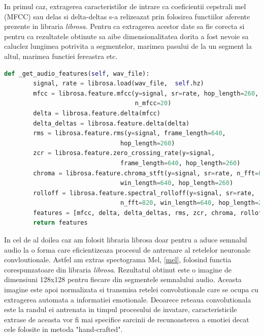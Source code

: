 \documentclass[a4paper,12pt]{book}
\begin{document}
				In primul caz, extragerea caracteristilor de intrare ca coeficientii cepstrali mel (MFCC) sau delas si delta-deltas s-a relizeazat prin folosirea functiilor aferente prezente in libraria \textit{librosa}. Pentru ca extragerea acestor date sa fie corecta si pentru ca rezultatele obtinute sa aibe dimensionalitatea dorita a fost nevoie sa caluclez lungimea potrivita a segmentelor, marimea pasului de la un segment la altul, marimea functiei fereastra etc. \par
				
				\begin{lstlisting}[language=Python, caption={Extragerea caracteristicilor hand-crafted, 3.3, folosind libraria librosa.}, xleftmargin=0cm]
 def _get_audio_features(self, wav_file):
		signal, rate = librosa.load(wav_file,  self.hz)
		mfcc = librosa.feature.mfcc(y=signal, sr=rate, hop_length=260, 
									n_mfcc=20)
		delta = librosa.feature.delta(mfcc)
		delta_deltas = librosa.feature.delta(delta)
		rms = librosa.feature.rms(y=signal, frame_length=640, 
								hop_length=260)
		zcr = librosa.feature.zero_crossing_rate(y=signal, 
								frame_length=640, hop_length=260)
		chroma = librosa.feature.chroma_stft(y=signal, sr=rate, n_fft=820, 
								win_length=640,	hop_length=260)
		rolloff = librosa.feature.spectral_rolloff(y=signal, sr=rate, 
								n_fft=820, win_length=640, hop_length=260)
		features = [mfcc, delta, delta_deltas, rms, zcr, chroma, rolloff]
		return features	\end{lstlisting}
				
				In cel de al doilea caz am folosit libraria librosa doar pentru a aduce semnalul audio la o forma care eficientizeaza procesul de antrenare al retelelor neuronale convloutionale. Astfel am extras spectograma Mel, \ref{mel}, folosind functia corespunzatoare din libraria \textit{librosa}. Rezultatul obtinut este o imagine de dimensiuni 128x128 pentru fiecare din segmentele semnalului audio. Aceasta imagine este apoi normalizata si transmisa retelei convolutionale care se ocupa cu extragerea automata a informatiei emotionale. Deoarece reteaua convolutionala este la randul ei antrenata in timpul procesului de invatare, caracteristicile extrase de aceasta vor fi mai specifice sarcinii de recunoasterea a emotiei decat cele folosite in metoda "hand-crafted". \par
				
\end{document}
